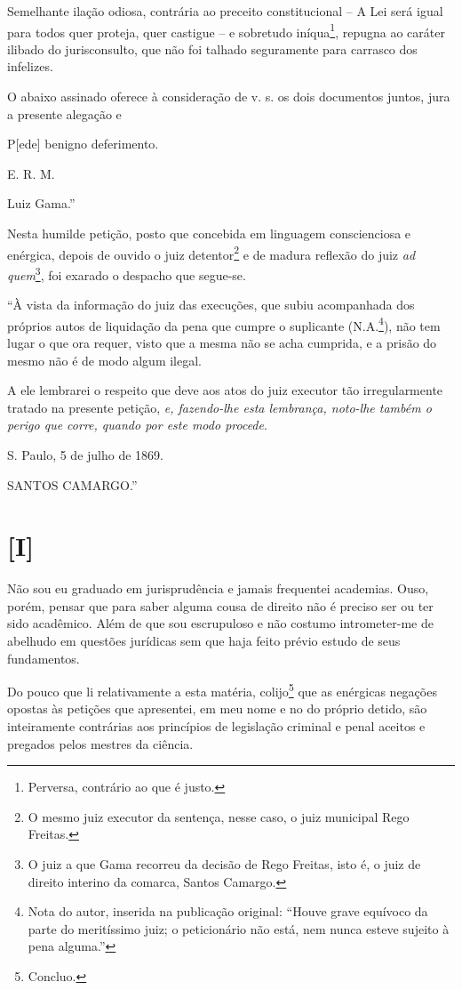 Semelhante ilação odiosa, contrária ao preceito constitucional -- A Lei
será igual para todos quer proteja, quer castigue -- e sobretudo
iníqua\footnote{Perversa, contrário ao que é justo.}, repugna ao
caráter ilibado do jurisconsulto, que não foi talhado seguramente para
carrasco dos infelizes.

O abaixo assinado oferece à consideração de v. s. os dois documentos
juntos, jura a presente alegação e

P{[}ede{]} benigno deferimento.

E. R. M.

Luiz Gama.''

Nesta humilde petição, posto que concebida em linguagem conscienciosa e
enérgica, depois de ouvido o juiz detentor\footnote{O mesmo juiz
  executor da sentença, nesse caso, o juiz municipal Rego Freitas.} e de
madura reflexão do juiz \emph{ad quem}\footnote{O juiz a que Gama
  recorreu da decisão de Rego Freitas, isto é, o juiz de direito
  interino da comarca, Santos Camargo.}, foi exarado o despacho que
segue-se.

``À vista da informação do juiz das execuções, que subiu acompanhada dos
próprios autos de liquidação da pena que cumpre o suplicante
(N.A.\footnote{Nota do autor, inserida na publicação original: ``Houve
  grave equívoco da parte do meritíssimo juiz; o peticionário não está,
  nem nunca esteve sujeito à pena alguma.''}), não tem lugar o que ora
requer, visto que a mesma não se acha cumprida, e a prisão do mesmo não
é de modo algum ilegal.

A ele lembrarei o respeito que deve aos atos do juiz executor tão
irregularmente tratado na presente petição, \emph{e, fazendo-lhe esta
lembrança, noto-lhe também o perigo que corre, quando por este modo
procede}.

S. Paulo, 5 de julho de 1869.

SANTOS CAMARGO.''

\section{{[}I{]}}

Não sou eu graduado em jurisprudência e jamais frequentei academias.
Ouso, porém, pensar que para saber alguma cousa de direito não é preciso
ser ou ter sido acadêmico. Além de que sou escrupuloso e não costumo
intrometer-me de abelhudo em questões jurídicas sem que haja feito
prévio estudo de seus fundamentos.

Do pouco que li relativamente a esta matéria, colijo\footnote{Concluo.}
que as enérgicas negações opostas às petições que apresentei, em meu
nome e no do próprio detido, são inteiramente contrárias aos princípios
de legislação criminal e penal aceitos e pregados pelos mestres da
ciência.

